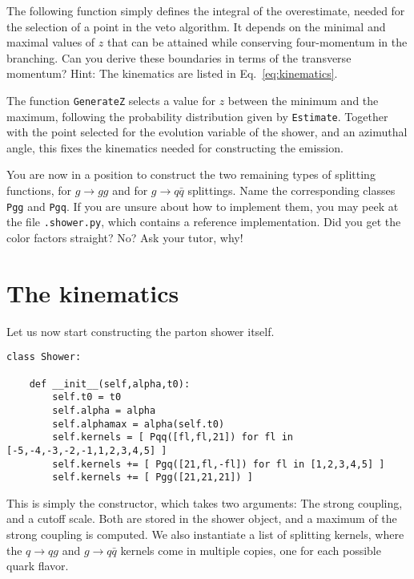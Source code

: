 \documentclass[10pt,fleqn]{scrartcl}
\begin{document}
The following function simply defines the integral of the overestimate, needed
for the selection of a point in the veto algorithm. It depends on the minimal and
maximal values of $z$ that can be attained while conserving four-momentum in the
branching. Can you derive these boundaries in terms of the transverse momentum?
Hint: The kinematics are listed in Eq.~\eqref{eq:kinematics}.

The function {\tt GenerateZ} selects a value for $z$ between the minimum and the
maximum, following the probability distribution given by {\tt Estimate}. Together
with the point selected for the evolution variable of the shower, and an azimuthal 
angle, this fixes the kinematics needed for constructing the emission.

You are now in a position to construct the two remaining types of splitting functions,
for $g\to gg$ and for $g\to q\bar{q}$ splittings. Name the corresponding classes
{\tt Pgg} and {\tt Pgq}. If you are unsure about how to implement them, you may
peek at the file {\tt .shower.py}, which contains a reference implementation.
Did you get the color factors straight? No? Ask your tutor, why!

\section{The kinematics}
Let us now start constructing the parton shower itself.
\begin{verbatim}
class Shower:

    def __init__(self,alpha,t0):
        self.t0 = t0
        self.alpha = alpha
        self.alphamax = alpha(self.t0)
        self.kernels = [ Pqq([fl,fl,21]) for fl in [-5,-4,-3,-2,-1,1,2,3,4,5] ]
        self.kernels += [ Pgq([21,fl,-fl]) for fl in [1,2,3,4,5] ]
        self.kernels += [ Pgg([21,21,21]) ]

\end{verbatim}
This is simply the constructor, which takes two arguments: The strong coupling,
and a cutoff scale. Both are stored in the shower object, and a maximum of the 
strong coupling is computed. We also instantiate a list of splitting kernels,
where the $q\to qg$ and $g\to q\bar{q}$ kernels come in multiple copies,
one for each possible quark flavor.
\end{document}
